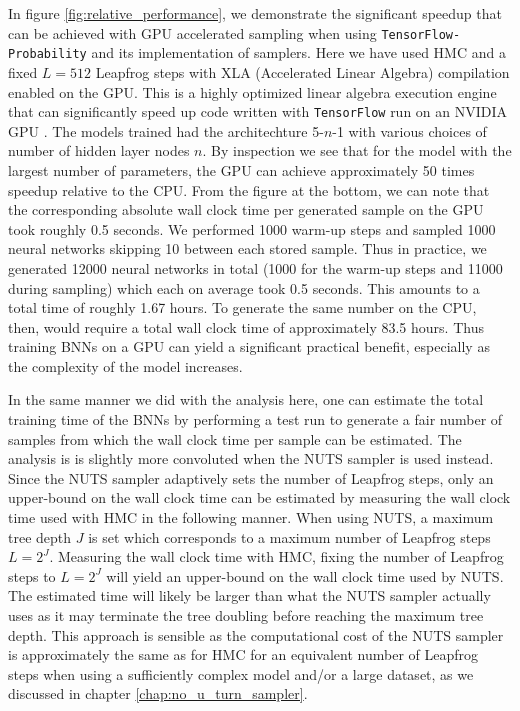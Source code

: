 In figure \ref{fig:relative_performance}, we demonstrate the significant speedup that can be achieved
with GPU accelerated sampling when using {\tt TensorFlow-Probability} and its implementation of samplers. Here we have used HMC and a fixed $L = 512$ Leapfrog steps with XLA (Accelerated Linear Algebra) compilation enabled on the GPU. This is a highly optimized linear algebra execution engine that can significantly speed up code written with {\tt TensorFlow} run on an NVIDIA GPU \cite{xla}. The models trained had the architechture 5-$n$-1 with various choices of number of hidden layer nodes $n$.
By inspection we see that for the model with the largest number of parameters, the GPU can achieve approximately 50 times speedup relative to the CPU.
From the figure at the bottom, we can note that the corresponding absolute wall clock time per generated sample on the GPU took roughly 0.5 seconds. We performed 1000 warm-up steps and sampled 1000 neural networks skipping 10 between each stored sample. Thus in practice, we generated 12000 neural networks in total (1000 for the warm-up steps and 11000 during sampling) which each on average took 0.5 seconds. This amounts to a total time of roughly 1.67 hours. To generate the same number on the CPU, then, would require a total wall clock time of approximately 83.5 hours. Thus training BNNs on a GPU can yield a significant practical benefit, especially as the complexity of the model increases. 

In the same manner we did with the analysis here, one can estimate the total training time of the BNNs by performing a test run to generate a fair number of samples from which the wall clock time per sample can be estimated. The analysis is is slightly more convoluted when the NUTS sampler is used instead. Since the NUTS sampler adaptively sets the number of Leapfrog steps, only an upper-bound on the wall clock time can be estimated by measuring the wall clock time used with HMC in the following manner. When using NUTS, a maximum tree depth $J$ is set which corresponds to a maximum number of Leapfrog steps $L = 2^J$. Measuring the wall clock time with HMC, fixing the number of Leapfrog steps to $L = 2^J$ will yield an upper-bound on the wall clock time used by NUTS. The estimated time will likely be larger than what the NUTS sampler actually uses as it may terminate the tree doubling before reaching the maximum tree depth. This approach is sensible as the computational cost of the NUTS sampler is approximately the same as for HMC for an equivalent number of Leapfrog steps when using a sufficiently complex model and/or a large dataset, as we discussed in chapter \ref{chap:no_u_turn_sampler}.

